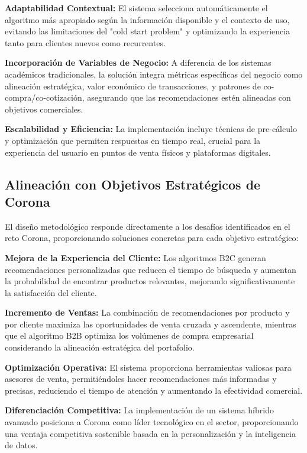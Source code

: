 \documentclass[twocolumn]{article}
\begin{document}
\textbf{Adaptabilidad Contextual:} El sistema selecciona automáticamente el algoritmo más apropiado según la información disponible y el contexto de uso, evitando las limitaciones del "cold start problem" y optimizando la experiencia tanto para clientes nuevos como recurrentes.

\textbf{Incorporación de Variables de Negocio:} A diferencia de los sistemas académicos tradicionales, la solución integra métricas específicas del negocio como alineación estratégica, valor económico de transacciones, y patrones de co-compra/co-cotización, asegurando que las recomendaciones estén alineadas con objetivos comerciales.

\textbf{Escalabilidad y Eficiencia:} La implementación incluye técnicas de pre-cálculo y optimización que permiten respuestas en tiempo real, crucial para la experiencia del usuario en puntos de venta físicos y plataformas digitales.

\subsection{Alineación con Objetivos Estratégicos de Corona}

El diseño metodológico responde directamente a los desafíos identificados en el reto Corona, proporcionando soluciones concretas para cada objetivo estratégico:

\textbf{Mejora de la Experiencia del Cliente:} Los algoritmos B2C generan recomendaciones personalizadas que reducen el tiempo de búsqueda y aumentan la probabilidad de encontrar productos relevantes, mejorando significativamente la satisfacción del cliente.

\textbf{Incremento de Ventas:} La combinación de recomendaciones por producto y por cliente maximiza las oportunidades de venta cruzada y ascendente, mientras que el algoritmo B2B optimiza los volúmenes de compra empresarial considerando la alineación estratégica del portafolio.

\textbf{Optimización Operativa:} El sistema proporciona herramientas valiosas para asesores de venta, permitiéndoles hacer recomendaciones más informadas y precisas, reduciendo el tiempo de atención y aumentando la efectividad comercial.

\textbf{Diferenciación Competitiva:} La implementación de un sistema híbrido avanzado posiciona a Corona como líder tecnológico en el sector, proporcionando una ventaja competitiva sostenible basada en la personalización y la inteligencia de datos.
\end{document}
